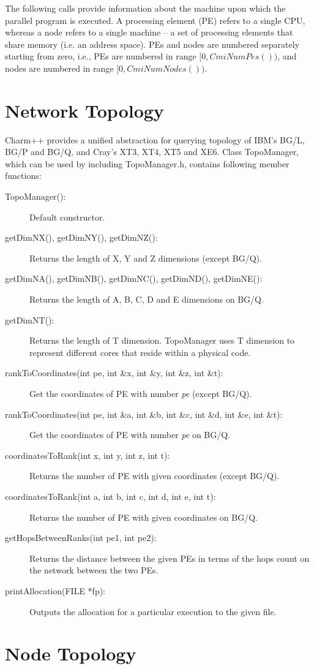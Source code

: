 The following calls provide information about the machine upon which the
parallel program is executed. A processing element (PE) refers to a single CPU,
whereas a node refers to a single machine -- a set of processing elements that share
memory (i.e. an address space).  PEs and nodes are numbered separately starting
from zero, i.e., PEs are numbered in range $[0,CmiNumPes())$, and nodes are
numbered in range $[0,CmiNumNodes())$.

\section{Network Topology}
Charm++ provides a unified abstraction for querying topology of IBM's BG/L, BG/P
and BG/Q, and Cray's XT3, XT4, XT5 and XE6. Class TopoManager, which can be used 
by including TopoManager.h, contains following member functions:

\begin{description}
\item [TopoManager():] Default constructor.
\item [getDimNX(), getDimNY(), getDimNZ():] Returns the length of X, Y and Z
dimensions (except BG/Q).
\item [getDimNA(), getDimNB(), getDimNC(), getDimND(), getDimNE():] Returns the
length of A, B, C, D and E dimensions on BG/Q.
\item [getDimNT():] Returns the length of T dimension. TopoManager uses T
dimension to represent different cores that reside within a physical code.
\item [rankToCoordinates(int pe, int \&x, int \&y, int \&z, int \&t):] Get the
coordinates of PE with number {\em pe} (except BG/Q).
\item [rankToCoordinates(int pe, int \&a, int \&b, int \&c, int \&d, int \&e, int
\&t):] Get the coordinates of PE with number {\em pe} on BG/Q.
\item [coordinatesToRank(int x, int y, int z, int t):] Returns the number of PE
with given coordinates (except BG/Q).
\item [coordinatesToRank(int a, int b, int c, int d, int e, int t):] Returns the
number of PE with given coordinates on BG/Q.
\item [getHopsBetweenRanks(int pe1, int pe2):] Returns the distance between the
given PEs in terms of the hops count on the network between the two PEs.
\item [printAllocation(FILE *fp):] Outputs the allocation for a particular
execution to the given file.

\end{description}


\section{Node Topology}




